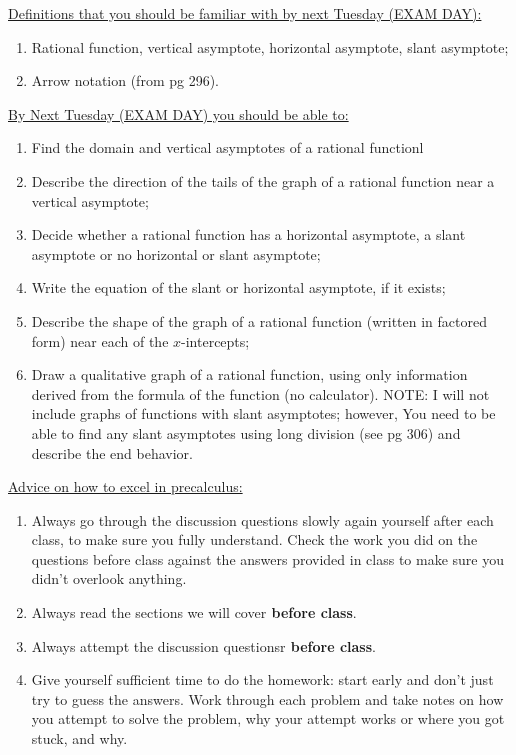 \documentclass[12pt,dvipsnames]{article}
\begin{document}
 \begin{mdframed}[style=exampledefault,linecolor=blue,linewidth=4pt,frametitle={Looking Ahead to EXAM DAY...}]
 	{\underline{Definitions that you should be familiar with by next Tuesday (EXAM DAY):} }
 	\begin{enumerate}[label= {  \arabic*:},labelindent=2em, style = standard,leftmargin=4pc, labelsep=*, noitemsep]
 		\item Rational function, vertical asymptote, horizontal asymptote, slant asymptote;
\item Arrow notation (from pg 296).

 	\end{enumerate}
 	{\underline{By Next Tuesday (EXAM DAY) you should be able to:} }
 	\begin{enumerate}[label= {  \arabic*:},labelindent=2em, style = standard,leftmargin=4pc, labelsep=*, noitemsep]
 		\item Find the domain and vertical asymptotes of a rational functionl
                     \item Describe the direction of the tails of the graph of a rational function near a vertical asymptote;\item Decide whether a rational function has a horizontal asymptote, a slant asymptote or no horizontal or slant asymptote;
\item Write the equation of the slant or horizontal asymptote, if it exists;
\item Describe the shape of the graph of a rational function (written in factored form) near each of the $x$-intercepts;
\item Draw a qualitative graph of a rational function, using only information derived from the formula of the function (no calculator). NOTE: I will not include graphs of functions with slant asymptotes; however, You need to be able to find any slant asymptotes using long division (see pg 306) and describe the end behavior.
 	\end{enumerate}
{\underline{Advice on how to excel in precalculus:} }
\begin{enumerate}[label= {  \arabic*:},labelindent=2em, style = standard,leftmargin=4pc, labelsep=*, noitemsep]
 		\item  Always go through the discussion questions slowly again yourself after each class, to make sure you fully understand.
Check the  work you did on the questions before class against the answers provided in class to make sure you didn't overlook anything.
\item Always read the sections we will cover{\bf{ before class}}.
\item Always attempt the discussion questionsr{\bf{ before class}}.
\item Give yourself sufficient time to do the homework: start early and don't just try to guess the answers. Work through each problem and take notes on how you attempt to solve the problem, why your attempt works or where you got stuck, and why.
\end{enumerate}
 	\end{mdframed}
\end{document}
